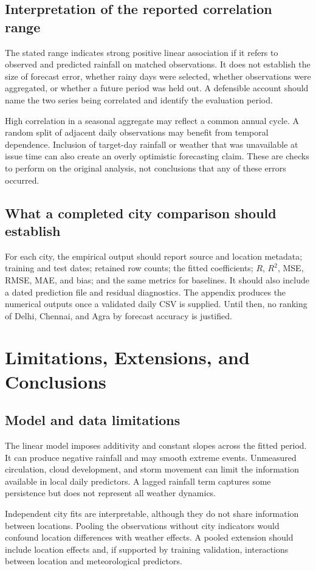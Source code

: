 \documentclass[11pt,a4paper]{article}
\newcommand{\sectionpage}[1]{\clearpage\section{#1}}
\begin{document}
\subsection{Interpretation of the reported correlation range}
The stated range indicates strong positive linear association if it refers to observed and predicted rainfall on matched observations. It does not establish the size of forecast error, whether rainy days were selected, whether observations were aggregated, or whether a future period was held out. A defensible account should name the two series being correlated and identify the evaluation period.

High correlation in a seasonal aggregate may reflect a common annual cycle. A random split of adjacent daily observations may benefit from temporal dependence. Inclusion of target-day rainfall or weather that was unavailable at issue time can also create an overly optimistic forecasting claim. These are checks to perform on the original analysis, not conclusions that any of these errors occurred.

\subsection{What a completed city comparison should establish}
For each city, the empirical output should report source and location metadata; training and test dates; retained row counts; the fitted coefficients; $R$, $R^2$, MSE, RMSE, MAE, and bias; and the same metrics for baselines. It should also include a dated prediction file and residual diagnostics. The appendix produces the numerical outputs once a validated daily CSV is supplied. Until then, no ranking of Delhi, Chennai, and Agra by forecast accuracy is justified.

\sectionpage{Limitations, Extensions, and Conclusions}
\subsection{Model and data limitations}
The linear model imposes additivity and constant slopes across the fitted period. It can produce negative rainfall and may smooth extreme events. Unmeasured circulation, cloud development, and storm movement can limit the information available in local daily predictors. A lagged rainfall term captures some persistence but does not represent all weather dynamics.

Independent city fits are interpretable, although they do not share information between locations. Pooling the observations without city indicators would confound location differences with weather effects. A pooled extension should include location effects and, if supported by training validation, interactions between location and meteorological predictors.
\end{document}
